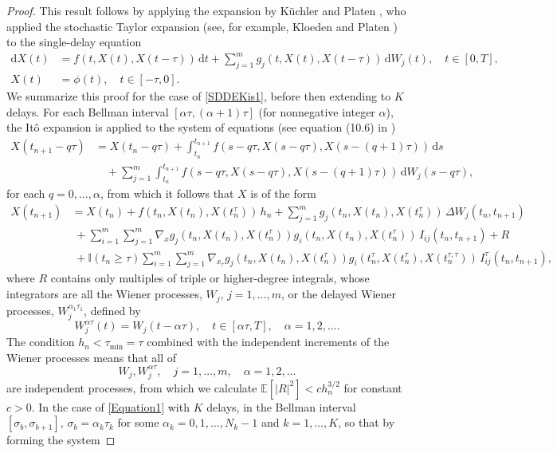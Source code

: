 \documentclass[onefignum]{siamart250211}
\providecommand{\abs}[1]{\left|#1\right|}
\begin{document}
\begin{proof}
This result follows by applying the expansion by K\"uchler and Platen \cite{KuchlerPlaten2000}, who applied the stochastic Taylor expansion (see, for example, Kloeden and Platen \cite{KloedenPlaten1999}) to the single-delay equation
\begin{align}
\mathrm{d}X(t)&=f(t,X(t),X(t-\tau))\,\mathrm{d}t+\sum_{j=1}^mg_j(t,X(t),X(t-\tau))\,\mathrm{d}W_j(t),\quad t\in[0,T],\label{SDDEKis1}\\
X(t)&=\phi(t),\quad t\in[-\tau,0].\nonumber
\end{align}
We summarize this proof for the case of \cref{SDDEKis1}, before then extending to $K$ delays. For each Bellman interval $[\alpha\tau,(\alpha+1)\tau]$ (for nonnegative integer $\alpha$), the It\^o expansion is applied to the system of equations (see equation (10.6) in \cite{KuchlerPlaten2000})
\begin{align}
X(t_{n+1}-q\tau)&=X(t_n-q\tau)+\int_{t_n}^{t_{n+1}}f(s-q\tau,X(s-q\tau),X(s-(q+1)\tau))\,\mathrm{d}s\nonumber\\
&\quad+\sum_{j=1}^m\int_{t_n}^{t_{n+1}}f(s-q\tau,X(s-q\tau),X(s-(q+1)\tau))\,\mathrm{d}W_j(s-q\tau),\label{XtnqSystem}
\end{align}
for each $q=0,\ldots,\alpha$, from which it follows that $X$ is of the form
\begin{align}
X(t_{n+1})&=X(t_n)+f(t_n,X(t_n),X(t_n^{\tau}))\,h_n+\sum_{j=1}^mg_j(t_n,X(t_n),X(t_n^{\tau}))\,\Delta W_j(t_n,t_{n+1})\nonumber\\
&\;+\sum_{i=1}^m\sum_{j=1}^m\nabla_xg_j(t_n,X(t_n),X(t_n^{\tau}))g_i(t_n,X(t_n),X(t_n^{\tau}))\,I_{ij}(t_n,\!t_{n+1})+R\label{DelayTaylorExpansionKis1}\\
&\;+\mathbb{I}(t_n\!\geqslant\!\tau)\!\sum_{i=1}^m\sum_{j=1}^m\nabla_{x_{\tau}}g_j(t_n,X(t_n),X(t_n^{\tau}))g_i(t_n^{\tau},X(t_n^{\tau}),X(t_n^{\tau,\tau}))\,I_{ij}^{\tau}(t_n,\!t_{n+1}),\nonumber
\end{align}
where $R$ contains only multiples of triple or higher-degree integrals, whose integrators are all the Wiener processes, $W_j$, $j=1,\ldots,m$, or the delayed Wiener processes, $W_j^{\alpha_1\tau_1}$, defined by \[W_j^{\alpha\tau}(t)=W_j(t-\alpha\tau),\quad t\in[\alpha\tau,T],\quad\alpha=1,2,\ldots.\]
The condition $h_n<\tau_\mathrm{min}=\tau$ combined with the independent increments of the Wiener processes means that all of
\[W_j,W_j^{\alpha\tau},\quad j=1,\ldots,m,\quad\alpha=1,2,\ldots\]
are independent processes, from which we calculate $\mathbb{E}[\abs{R}^2]<ch_n^{3/2}$ for constant $c>0$. In the case of \cref{Equation1} with $K$ delays, in the Bellman interval $[\sigma_b,\sigma_{b+1}]$, $\sigma_b=\alpha_k\tau_k$ for some $\alpha_k=0,1,\ldots,N_k-1$ and $k=1,\ldots,K$, so that by forming the system

\end{proof}
\end{document}
